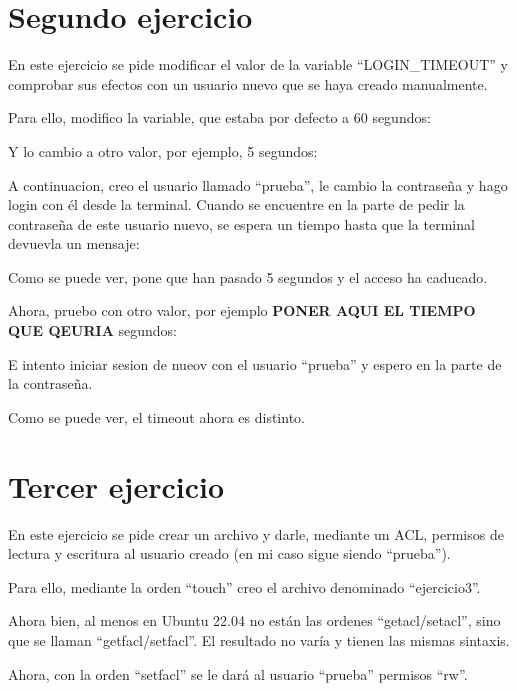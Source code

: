 \documentclass{article}
\begin{document}
\section{Segundo ejercicio}
En este ejercicio se pide modificar el valor de la variable ``LOGIN\_TIMEOUT'' y comprobar sus efectos con un usuario nuevo que se haya creado manualmente.

Para ello, modifico la variable, que estaba por defecto a 60 segundos:


Y lo cambio a otro valor, por ejemplo, 5 segundos:


A continuacion, creo el usuario llamado ``prueba'', le cambio la contraseña y hago login con él desde la terminal. Cuando se encuentre en la parte de pedir la contraseña de este usuario nuevo, se espera un tiempo hasta que la terminal devuevla un mensaje:


Como se puede ver, pone que han pasado 5 segundos y el acceso ha caducado.

Ahora, pruebo con otro valor, por ejemplo \textbf{PONER AQUI EL TIEMPO QUE QEURIA} segundos:


E intento iniciar sesion de nueov con el usuario ``prueba'' y espero en la parte de la contraseña.


Como se puede ver, el timeout ahora es distinto.


\section{Tercer ejercicio}
En este ejercicio se pide crear un archivo y darle, mediante un ACL, permisos de lectura y escritura al usuario creado (en mi caso sigue siendo ``prueba'').

Para ello, mediante la orden ``touch'' creo el archivo denominado ``ejercicio3''.

Ahora bien, al menos en Ubuntu 22.04 no están las ordenes ``getacl/setacl'', sino que se llaman ``getfacl/setfacl''. El resultado no varía y tienen las mismas sintaxis.


Ahora, con la orden ``setfacl'' se le dará al usuario ``prueba'' permisos ``rw''.
\end{document}
